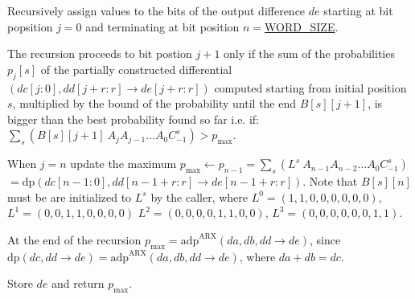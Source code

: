 \begin{DoxyItemize}
\item \-Recursively assign values to the bits of the output difference $de$ starting at bit popsition $j = 0$ and terminating at bit position $n=$\hyperlink{common_8hh_a92ed8507d1cd2331ad09275c5c4c1c89}{\-W\-O\-R\-D\-\_\-\-S\-I\-Z\-E}.
\item \-The recursion proceeds to bit postion $j + 1$ only if the sum of the probabilities $p_j[s]$ of the partially constructed differential $(dc[j:0], dd[j+r:r] \rightarrow de[j+r:r])$ computed starting from initial position $s$, multiplied by the bound of the probability until the end $B[s][j+1]$, is bigger than the best probability found so far i.\-e. if\-: $\sum_{s} (B[s][j+1]~ A_{j} A_{j-1} \ldots A_{0} C^{s}_{-1}) > p_{\mathrm{max}}$.
\item \-When $j = n$ update the maximum $p_{\mathrm{max}} \leftarrow p_{n-1} = \sum_{s} (L^{s}~ A_{n-1} A_{n-2} \ldots A_{0} C^{s}_{-1})$ $ = \mathrm{dp}(dc[n-1:0],dd[n-1+r:r] \rightarrow de[n-1+r:r])$. \-Note that $B[s][n]$ must be are initialized to $L^{s}$ by the caller, where $L^{0} = (1,1,0,0,0,0,0,0)$, $L^{1} = (0,0,1,1,0,0,0,0)$ $L^{2} = (0,0,0,0,1,1,0,0)$, $L^{3} = (0,0,0,0,0,0,1,1)$.
\item \-At the end of the recursion $p_\mathrm{max} = \mathrm{adp}^{\mathrm{ARX}}(da,db,dd \rightarrow de)$, since $\mathrm{dp}(dc,dd \rightarrow de) = \mathrm{adp}^{\mathrm{ARX}}(da,db,dd \rightarrow de)$, where $da + db = dc$.
\item \-Store $de$ and return $p_\mathrm{max}$.
\end{DoxyItemize}

